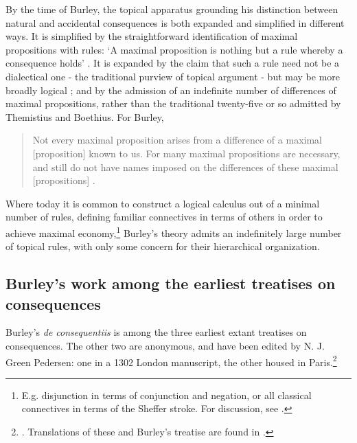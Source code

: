 	By the time of Burley, the topical apparatus grounding his distinction between natural and accidental consequences is both expanded and simplified in different ways. It is simplified by the straightforward identification of maximal propositions with rules: `A maximal proposition is nothing but a rule whereby a consequence holds' \autocite[p. 76]{BurleyDPAL}. It is expanded by the claim that such a rule need not be a dialectical one - the traditional purview of topical argument - but may be more broadly logical \autocite[p. 76]{BurleyDPAL}; and by the admission of an indefinite number of differences of maximal propositions, rather than the traditional twenty-five or so admitted by Themistius and Boethius. For Burley,
	\begin{quote}
		Not every maximal proposition arises from a difference of a maximal [proposition] known to us. For many maximal propositions are necessary, and still do not have names imposed on the differences of these maximal [propositions] \autocite[pp. 76-77]{BurleyDPAL}.
	\end{quote}
	
	Where today it is common to construct a logical calculus out of a minimal number of rules, defining familiar connectives in terms of others in order to achieve maximal economy,\footnote{E.g. disjunction in terms of conjunction and negation, or all classical connectives in terms of the Sheffer stroke. For discussion, see \cite{Paseau2016}.} Burley's theory admits an indefinitely large number of topical rules, with only some concern for their hierarchical organization.
	
	\subsection{Burley's work among the earliest treatises on consequences}
	Burley's \textit{de consequentiis} is among the three earliest extant treatises on consequences. The other two are anonymous, and have been edited by N. J. Green Pedersen: one in a 1302 London manuscript, the other housed in Paris.\footnote{\cite{Green-Pedersen1980a}. Translations of these and Burley's treatise are found in \cite{Archambault2017d}.}
	
